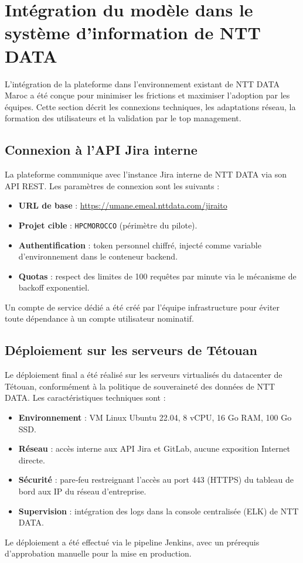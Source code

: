 \section{Intégration du modèle dans le système d’information de NTT DATA}
L’intégration de la plateforme dans l’environnement existant de NTT DATA Maroc a été conçue pour minimiser les frictions et maximiser l’adoption par les équipes. Cette section décrit les connexions techniques, les adaptations réseau, la formation des utilisateurs et la validation par le top management.

\subsection{Connexion à l’API Jira interne}
La plateforme communique avec l’instance Jira interne de NTT DATA via son API REST. Les paramètres de connexion sont les suivants :
\begin{itemize}
    \renewcommand{\labelitemi}{—}
    \item \textbf{URL de base} : \url{https://umane.emeal.nttdata.com/jiraito}
    \item \textbf{Projet cible} : \texttt{HPCMOROCCO} (périmètre du pilote).
    \item \textbf{Authentification} : token personnel chiffré, injecté comme variable d’environnement dans le conteneur backend.
    \item \textbf{Quotas} : respect des limites de 100 requêtes par minute via le mécanisme de backoff exponentiel.
\end{itemize}
Un compte de service dédié a été créé par l’équipe infrastructure pour éviter toute dépendance à un compte utilisateur nominatif.

\subsection{Déploiement sur les serveurs de Tétouan}
Le déploiement final a été réalisé sur les serveurs virtualisés du datacenter de Tétouan, conformément à la politique de souveraineté des données de NTT DATA. Les caractéristiques techniques sont :
\begin{itemize}
    \renewcommand{\labelitemi}{—}
    \item \textbf{Environnement} : VM Linux Ubuntu 22.04, 8 vCPU, 16 Go RAM, 100 Go SSD.
    \item \textbf{Réseau} : accès interne aux API Jira et GitLab, aucune exposition Internet directe.
    \item \textbf{Sécurité} : pare‑feu restreignant l’accès au port 443 (HTTPS) du tableau de bord aux IP du réseau d’entreprise.
    \item \textbf{Supervision} : intégration des logs dans la console centralisée (ELK) de NTT DATA.
\end{itemize}
Le déploiement a été effectué via le pipeline Jenkins, avec un prérequis d’approbation manuelle pour la mise en production.

